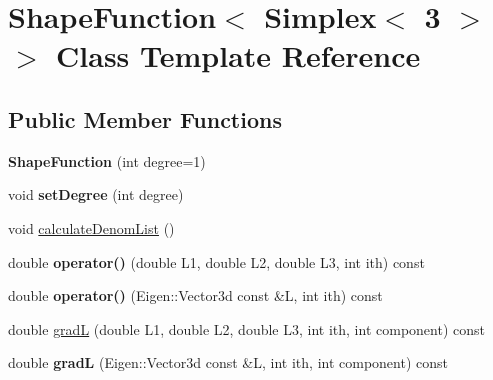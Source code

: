 \hypertarget{class_shape_function_3_01_simplex_3_013_01_4_01_4}{
\section{ShapeFunction$<$ Simplex$<$ 3 $>$ $>$ Class Template Reference}
\label{class_shape_function_3_01_simplex_3_013_01_4_01_4}
}
\subsection*{Public Member Functions}
\begin{DoxyCompactItemize}
\item 
\hypertarget{class_shape_function_3_01_simplex_3_013_01_4_01_4_a9c4b111da2288a1a1723d804a967ed35}{
{\bfseries ShapeFunction} (int degree=1)}
\label{class_shape_function_3_01_simplex_3_013_01_4_01_4_a9c4b111da2288a1a1723d804a967ed35}

\item 
\hypertarget{class_shape_function_3_01_simplex_3_013_01_4_01_4_a2e966005bc3920556eb59c9bd9d5e476}{
void {\bfseries setDegree} (int degree)}
\label{class_shape_function_3_01_simplex_3_013_01_4_01_4_a2e966005bc3920556eb59c9bd9d5e476}

\item 
void \hyperlink{class_shape_function_3_01_simplex_3_013_01_4_01_4_a29f3c8eb14caba5ea649481f66b3d6a7}{calculateDenomList} ()
\item 
\hypertarget{class_shape_function_3_01_simplex_3_013_01_4_01_4_aa30f08f898a856db959138eaf2274063}{
double {\bfseries operator()} (double L1, double L2, double L3, int ith) const }
\label{class_shape_function_3_01_simplex_3_013_01_4_01_4_aa30f08f898a856db959138eaf2274063}

\item 
\hypertarget{class_shape_function_3_01_simplex_3_013_01_4_01_4_a42bc267d0b445257e762a2f74a38508e}{
double {\bfseries operator()} (Eigen::Vector3d const \&L, int ith) const }
\label{class_shape_function_3_01_simplex_3_013_01_4_01_4_a42bc267d0b445257e762a2f74a38508e}

\item 
double \hyperlink{class_shape_function_3_01_simplex_3_013_01_4_01_4_a5e3a627dbe81b204c444782f976f1925}{gradL} (double L1, double L2, double L3, int ith, int component) const 
\item 
\hypertarget{class_shape_function_3_01_simplex_3_013_01_4_01_4_a53273fbe4e05565374ff4476929b5116}{
double {\bfseries gradL} (Eigen::Vector3d const \&L, int ith, int component) const }
\label{class_shape_function_3_01_simplex_3_013_01_4_01_4_a53273fbe4e05565374ff4476929b5116}


\end{DoxyCompactItemize}
